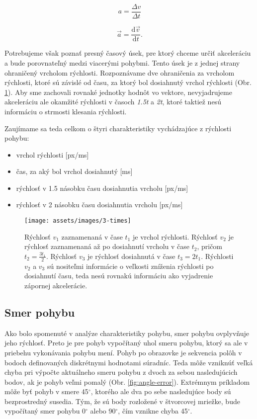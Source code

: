 \begin{equation}
{\displaystyle a={\frac {\Delta v}{\Delta t}}}
\label{eq:acceleration-as-fract}
\end{equation}

\begin{equation}
{\displaystyle {\vec {a}}={\frac {\mathrm {d} {\vec {v}}}{\mathrm {d} t}}.}
\label{eq:acceleration-as-derivation}
\end{equation}

Potrebujeme však poznať presný časový úsek, pre ktorý chceme určiť akceleráciu a bude porovnateľný medzi viacerými pohybmi. Tento úsek je z jednej strany ohraničený vrcholom rýchlosti. Rozpoznávame dve ohraničenia za vrcholom rýchlosti, ktoré sú závislé od času, za ktorý bol dosiahnutý vrchol rýchlosti (Obr. \ref{fig:velocity-3-times}). Aby sme zachovali rovnaké jednotky hodnôt vo vektore, nevyjadrujeme akceleráciu ale okamžité rýchlosti v časoch \emph{1.5t} a \emph{2t}, ktoré taktiež nesú informáciu o strmosti klesania rýchlosti.

Zaujímame sa teda celkom o štyri charakteristiky vychádzajúce z rýchlosti pohybu:
\begin{itemize}[noitemsep]
\item vrchol rýchlosti [px/ms]
\item čas, za aký bol vrchol dosiahnutý [ms]
\item rýchlosť v 1.5 násobku času dosiahnutia vrcholu [px/ms]
\item rýchlosť v 2 násobku času dosiahnutia vrcholu [px/ms]
\end{itemize}

\begin{figure}[h]
\centering
\texttt{[image: assets/images/3-times]}
\par
\caption{Rýchlosť \emph{$v_{1}$} zaznamenaná v čase \emph{$t_{1}$} je vrchol rýchlosti. Rýchlosť \emph{$v_{2}$} je rýchlosť zaznamenaná až po dosiahnutí vrcholu v čase \emph{$t_{2}$}, pričom \emph{$t_{2} = \frac{3t_{1}}{2}$}. Rýchlosť \emph{$v_{3}$} je rýchlosť dosiahnutá v čase \emph{$t_{3} = 2t_{1}$}. Rýchlosti \emph{$v_{2}$} a \emph{$v_{3}$} sú nositeľmi informácie o veľkosti zníženia rýchlosti po dosiahnutí času, teda nesú rovnakú informáciu ako vyjadrenie zápornej akcelerácie. \label{fig:velocity-3-times}}
\end{figure}

\subsection{Smer pohybu}
Ako bolo spomenuté v analýze charakteristiky pohybu, smer pohybu ovplyvňuje jeho rýchlosť. Preto je pre pohyb vypočítaný uhol smeru pohybu, ktorý sa ale v priebehu vykonávania pohybu mení. Pohyb po obrazovke je sekvencia polôh v bodoch definovaných diskrétnymi hodnotami súradníc. Teda môže vzniknúť veľká chyba pri výpočte aktuálneho smeru pohybu z dvoch za sebou nasledujúcich bodov, ak je pohyb veľmi pomalý (Obr. \ref{fig:angle-error}). Extrémnym príkladom môže byť pohyb v smere 45$^{\circ}$, ktorého ale dva po sebe nasledujúce body sú bezprostredný susedia. Tým, že sú body rozložené v štvorcovej mriežke, bude vypočítaný smer pohybu 0$^{\circ}$ alebo 90$^{\circ}$, čím vznikne chyba 45$^{\circ}$. 

